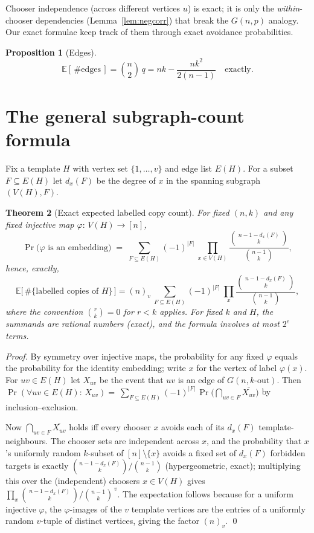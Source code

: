 \documentclass[11pt,a4paper]{article}
\newtheorem{theorem}{Theorem}[section]
\newtheorem{proposition}[theorem]{Proposition}
\theoremstyle{definition}
\theoremstyle{definition}
\begin{document}
Chooser independence (across different vertices $u$) is exact; it is only the
\emph{within}-chooser dependencies (Lemma~\ref{lem:negcorr}) that break the
$G(n,p)$ analogy. Our exact formulae keep track of them through exact
avoidance probabilities.

\begin{proposition}[Edges]\label{prop:edges}
\[
\mathbb E[\,\#\text{edges}\,] = \binom{n}{2}\,q = nk-\frac{nk^2}{2(n-1)}\quad\text{exactly.}
\]
\end{proposition}

\section{The general subgraph-count formula}\label{sec:general}

Fix a template $H$ with vertex set \(\{1,\dots,v\}\) and edge list
$E(H)$. For a subset $F\subseteq E(H)$ let $d_x(F)$ be the degree of $x$ in the
spanning subgraph $(V(H),F)$.

\begin{theorem}[Exact expected labelled copy count]\label{thm:general}
For fixed $(n,k)$ and any fixed injective map $\varphi:\, V(H)\to [n]$,
\[
\Pr\bigl(\varphi \text{ is an embedding}\bigr)
\;=\;\sum_{F\subseteq E(H)}(-1)^{|F|}\ \prod_{x\in V(H)}
\frac{\binom{\,n-1-d_x(F)\,}{k}}{\binom{n-1}{k}},
\]
hence, exactly,
\[
\mathbb E\bigl[\,\#\{\text{labelled copies of }H\}\,\bigr]
= (n)_{v}\ \sum_{F\subseteq E(H)}(-1)^{|F|}\ \prod_{x}
\frac{\binom{\,n-1-d_x(F)\,}{k}}{\binom{n-1}{k}},
\]
where the convention $\binom{r}{k}=0$ for $r<k$ applies. For fixed $k$ and $H$, the
summands are rational numbers (exact), and the formula involves at most
$2^{e}$ terms.
\end{theorem}

\begin{proof}
By symmetry over injective maps, the probability for any fixed $\varphi$ equals the
probability for the identity embedding; write $x$ for the vertex of label
$\varphi(x)$. For $uv \in E(H)$ let $X_{uv}$ be the event that $uv$ is an edge of
$G(n,k\text{-out})$. Then
$\Pr(\forall uv\in E(H):\, X_{uv}) =\ \sum_{F \subseteq E(H)}(-1)^{|F|}\,
\Pr\bigl(\bigcap_{uv\in F}\overline{X_{uv}}\bigr)$
by inclusion--exclusion.

Now $\bigcap_{uv \in F}\overline{X_{uv}}$ holds iff every chooser $x$ avoids each of
its $d_x(F)$ template-neighbours. The chooser sets are independent across $x$, and
the probability that $x$'s uniformly random $k$-subset of $[n]\setminus\{x\}$
avoids a fixed set of $d_x(F)$ forbidden targets is exactly
$\binom{n-1-d_x(F)}{k}/\binom{n-1}{k}$ (hypergeometric, exact); multiplying this
over the (independent) choosers $x\in V(H)$ gives
$\prod_x \binom{\,n-1-d_x(F)\,}{k}/\binom{n-1}{k}^{\,v}$.
The expectation follows because for a uniform injective $\varphi$, the
$\varphi$-images of the $v$ template vertices are the entries of a uniformly random
$v$-tuple of distinct vertices, giving the factor $(n)_v$. \qed
\end{proof}
\end{document}
